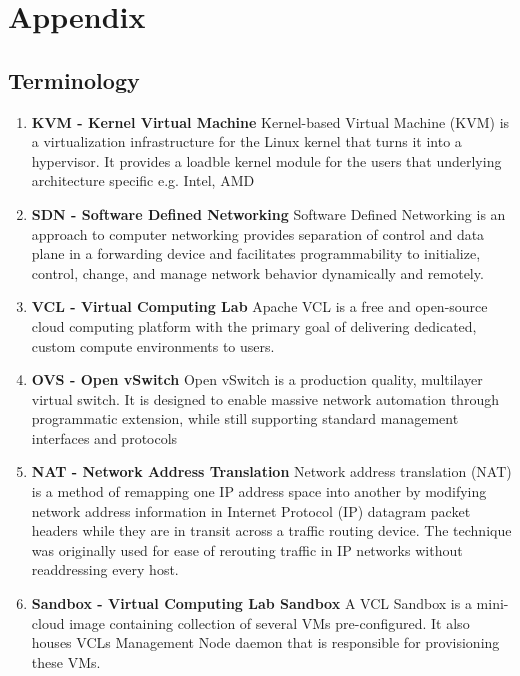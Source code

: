 \documentclass[12pt]{extarticle}
\begin{document}
\section{Appendix}
\subsection{Terminology}
\begin{enumerate}
    \item \textbf{KVM - Kernel Virtual Machine}
     \newline
    Kernel-based Virtual Machine (KVM) is a virtualization infrastructure for the Linux kernel that turns it into a hypervisor. It provides a loadble kernel module for the users that underlying architecture specific e.g. Intel, AMD
    
    \item \textbf{SDN - Software Defined Networking}
    \newline
    Software Defined Networking is an approach to computer networking provides separation of control and data plane in a forwarding device and facilitates programmability to initialize, control, change, and manage network behavior dynamically and remotely.
    
    \item \textbf{VCL - Virtual Computing Lab}
    \newline
    Apache VCL is a free and open-source cloud computing platform with the primary goal of delivering dedicated, custom compute environments to users.
    
    \item \textbf{OVS - Open vSwitch}
    \newline
    Open vSwitch is a production quality, multilayer virtual switch. It is designed to enable massive network automation through programmatic extension, while still supporting standard management interfaces and protocols
    
    \item \textbf{NAT - Network Address Translation}
    \newline
    Network address translation (NAT) is a method of remapping one IP address space into another by modifying network address information in Internet Protocol (IP) datagram packet headers while they are in transit across a traffic routing device. The technique was originally used for ease of rerouting traffic in IP networks without readdressing every host.
    
    \item \textbf{Sandbox - Virtual Computing Lab Sandbox}
    \newline
    A VCL Sandbox is a mini-cloud image containing collection of several VMs pre-configured. It also houses VCL\textquotesingle s Management Node daemon that is responsible for provisioning these VMs.  
    
\end{enumerate}



\end{document}
